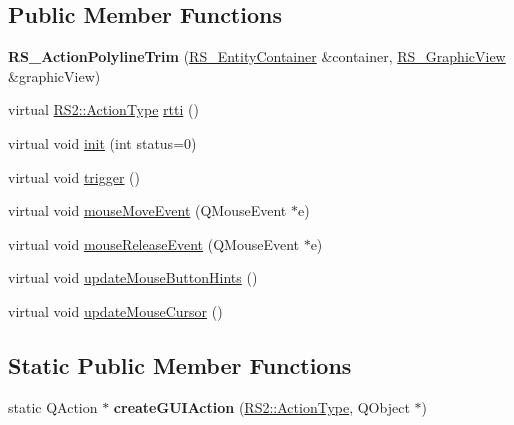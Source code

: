 \subsection*{Public Member Functions}
\begin{DoxyCompactItemize}
\item 
\hypertarget{classRS__ActionPolylineTrim_ac93e5f36ec7bb70acee9038718b08a45}{{\bfseries R\-S\-\_\-\-Action\-Polyline\-Trim} (\hyperlink{classRS__EntityContainer}{R\-S\-\_\-\-Entity\-Container} \&container, \hyperlink{classRS__GraphicView}{R\-S\-\_\-\-Graphic\-View} \&graphic\-View)}\label{classRS__ActionPolylineTrim_ac93e5f36ec7bb70acee9038718b08a45}

\item 
virtual \hyperlink{classRS2_afe3523e0bc41fd637b892321cfc4b9d7}{R\-S2\-::\-Action\-Type} \hyperlink{classRS__ActionPolylineTrim_a0c838a448ac2de76b397d12323031af5}{rtti} ()
\item 
virtual void \hyperlink{classRS__ActionPolylineTrim_af09cce1b4d6ffc0672c97e232121d4cf}{init} (int status=0)
\item 
virtual void \hyperlink{classRS__ActionPolylineTrim_ac8553ad877b92eef0effb1ae48f3606c}{trigger} ()
\item 
virtual void \hyperlink{classRS__ActionPolylineTrim_a19ee5bdad93dabd5f9304a5c3521582f}{mouse\-Move\-Event} (Q\-Mouse\-Event $\ast$e)
\item 
virtual void \hyperlink{classRS__ActionPolylineTrim_a2ce12a59701866fb703faca8a3527bab}{mouse\-Release\-Event} (Q\-Mouse\-Event $\ast$e)
\item 
virtual void \hyperlink{classRS__ActionPolylineTrim_a36cafe415280c699e4015b3d8e2348c1}{update\-Mouse\-Button\-Hints} ()
\item 
virtual void \hyperlink{classRS__ActionPolylineTrim_ad2314cc0c00ef8f3915cd3b3378d4166}{update\-Mouse\-Cursor} ()
\end{DoxyCompactItemize}
\subsection*{Static Public Member Functions}
\begin{DoxyCompactItemize}
\item 
\hypertarget{classRS__ActionPolylineTrim_a689a808d0d43a05a58917e1317ef05fc}{static Q\-Action $\ast$ {\bfseries create\-G\-U\-I\-Action} (\hyperlink{classRS2_afe3523e0bc41fd637b892321cfc4b9d7}{R\-S2\-::\-Action\-Type}, Q\-Object $\ast$)}\label{classRS__ActionPolylineTrim_a689a808d0d43a05a58917e1317ef05fc}

\end{DoxyCompactItemize}
